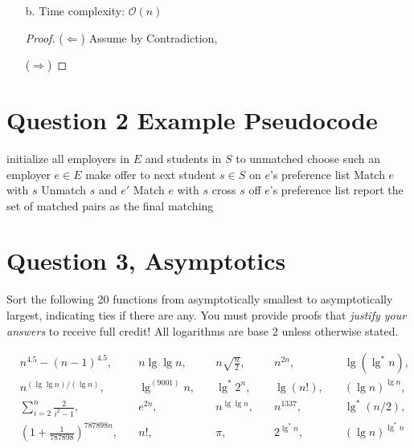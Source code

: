 \documentclass[11pt,fleqn]{article}
\newcommand{\bigO}{\ensuremath{\mathcal{O}}}
\theoremstyle{definition}
\theoremstyle{remark}
\begin{document}
\begin{enumerate}
\begin{proof}
        Finally, the number of unique RGB sequences of n dashes 
        is $3^n$ (as previously proven) which means that:

        \[
        \sum_{k=0}^{n} \binom{n}{k} 2^{k} = 3^n
        \]

    \end{proof}
    
    \item[b.]
    Time complexity: $\bigO (n)$
    \begin{proof}
    ($\Leftarrow$) Assume by Contradiction,
    
    ($\Rightarrow$)
    \end{proof}
    
\end{enumerate}
\newpage
\clearpage
\section{Question 2 Example Pseudocode}

\begin{algorithmic}[1]
	\State initialize all employers in $E$ and students in $S$ to unmatched
	\State choose such an employer $e \in E$
	\State make offer to next student $s \in S$ on $e$'s preference list
	\State Match $e$ with $s$ 
	\State Unmatch $s$ and $e'$ 
	\State Match $e$ with $s$ 
	\EndIf
	\State cross $s$ off $e$'s preference list
	\EndWhile
	\State report the set of matched pairs as the final matching
	\EndFunction
\end{algorithmic}


\newpage
\section{Question 3, Asymptotics}
Sort the following 20 functions from asymptotically smallest to asymptotically largest, indicating ties if there are any. You must provide proofs that \textit{justify your answers} to receive full credit! All logarithms are base 2 unless otherwise stated.

\[
\begin{aligned}
& n^{4.5} - (n - 1)^{4.5}, & \quad n \lg \lg n, & \quad n\sqrt{\frac{n}{2}}, & \quad n^{2n}, & \quad \lg(\lg^*n), \\
& n^{({\lg \lg n})/({\lg n})}, & \quad \lg^{(9001)} n, & \quad \lg^*2^{n}, & \quad \lg(n!), & \quad (\lg n)^{\lg n}, \\
& \sum_{i=2}^n \frac{2}{{i}^2-1}, & \quad e^{2n}, & \quad n^{\lg \lg n}, & \quad n^{1337}, & \quad \lg^*{(n/2)}, \\
& (1 + \frac{1}{787898})^{787898n}, & \quad n!, & \quad \pi, & \quad 2^{\lg^*n}, & \quad (\lg n)^{\lg^* n}
\end{aligned}
\]\\
\end{document}
